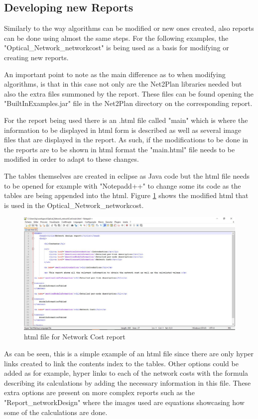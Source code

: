 	\newpage

	\subsection{Developing new Reports}
	Similarly to the way algorithms can be modified or new ones created, also reports can be done using almost the same steps. For the following examples, the "Optical\_Network\_networkcost" is being used as a basis for modifying or creating new reports.

	An important point to note as the main difference as to when modifying algorithms, is that in this case not only are the Net2Plan libraries needed but also the extra files summoned by the report. These files can be found opening the "BuiltInExamples.jar" file in the Net2Plan directory on the corresponding report.

	For the report being used there is an .html file called "main" which is where the information to be displayed in html form is described as well as several image files that are displayed in the report. As such, if the modifications to be done in the reports are to be shown in html format the "main.html" file needs to be modified in order to adapt to these changes.
	
	The tables themselves are created in eclipse as Java code but the html file needs to be opened for example with "Notepadd++" to change some its code as the tables are being appended into the html. Figure \ref{html_report} shows the modified html that is used in the Optical\_Network\_networkcost.
	
	\begin{figure}[h!]
		\centering
		\includegraphics[width = 17cm]{html_report.pdf}
		\caption{html file for Network Cost report}
		\label{html_report}
	\end{figure}	
		
	As can be seen, this is a simple example of an html file since there are only hyper links created to link the contents index to the tables. Other options could be added as for example, hyper links to each of the network costs with the formula describing its calculations by adding the necessary information in this file. These extra options are present on more complex reports such as the "Report\_networkDesign" where the images used are equations showcasing how some of the calculations are done.
	
\clearpage
